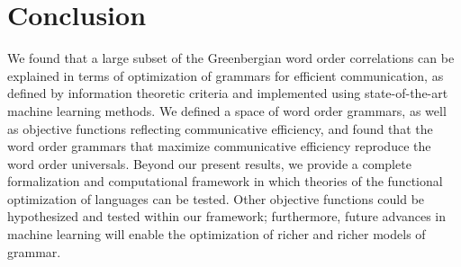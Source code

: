 \documentclass[9pt,twocolumn,twoside,lineno]{pnas-new}
\begin{document}









\section{Conclusion}

We found that a large subset of the Greenbergian word order correlations can be explained in terms of optimization of grammars for efficient communication, as defined by information theoretic criteria and implemented using state-of-the-art machine learning methods. We defined a space of word order grammars, as well as objective functions reflecting communicative efficiency, and found that the word order grammars that maximize communicative efficiency reproduce the word order universals. Beyond our present results, we provide a complete formalization and computational framework in which theories of the functional optimization of languages can be tested. Other objective functions could be hypothesized and tested within our framework; furthermore, future advances in machine learning will enable the optimization of richer and richer models of grammar.
\end{document}

